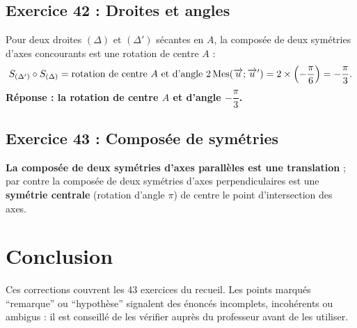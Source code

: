 \subsection{Exercice 42 : Droites et angles}

Pour deux droites $(\Delta)$ et $(\Delta')$ s\'ecantes en $A$, la compos\'ee de deux sym\'etries d'axes concourants est une rotation de centre $A$ :
\[
S_{(\Delta')}\circ S_{(\Delta)}=\text{rotation de centre }A\text{ et d'angle }2\,\mathrm{Mes}(\overrightarrow{u};\overrightarrow{u}')
=2\times\left(-\frac{\pi}{6}\right)=-\frac{\pi}{3}.
\]
\textbf{R\'eponse : la rotation de centre $A$ et d'angle $-\dfrac{\pi}{3}$.}

\subsection{Exercice 43 : Compos\'ee de sym\'etries}

\textbf{La compos\'ee de deux sym\'etries d'axes parall\`eles est une \textbf{translation}} ; par contre la compos\'ee de deux
sym\'etries d'axes perpendiculaires est une \textbf{sym\'etrie centrale} (rotation d'angle $\pi$) de centre le point d'intersection des axes.

\section*{Conclusion}
Ces corrections couvrent les 43 exercices du recueil. Les points marqu\'es ``remarque'' ou ``hypoth\`ese'' signalent des
\'enonc\'es incomplets, incoh\'erents ou ambigus : il est conseill\'e de les v\'erifier aupr\`es du professeur avant de les utiliser.
